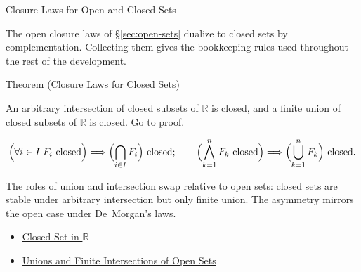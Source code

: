 \label{sec:unions-and-intersections}

\begin{topicbox}{Closure Laws for Open and Closed Sets}
\begin{exposition}
The open closure laws of \S\ref{sec:open-sets} dualize to closed sets by complementation. Collecting them gives the bookkeeping rules used throughout the rest of the development.
\end{exposition}
\end{topicbox}
\begin{theorembox}{Theorem (Closure Laws for Closed Sets)}
\begin{theorem}
\label{thm:closed-set-closure-operations}
An arbitrary intersection of closed subsets of $\mathbb{R}$ is closed, and a finite union of closed subsets of $\mathbb{R}$ is closed.
\hyperref[prf:closed-set-closure-operations]{Go to proof.}
\end{theorem}
\end{theorembox}
\begin{remark*}
\[
\Bigl(\forall i\in I\;F_i\text{ closed}\Bigr)\Longrightarrow \Bigl(\bigcap_{i\in I} F_{i}\Bigr) \text{ closed};\qquad
\Bigl(\bigwedge_{k=1}^{n} F_k\text{ closed}\Bigr)\Longrightarrow \Bigl(\bigcup_{k=1}^{n} F_{k}\Bigr) \text{ closed}.
\]
\end{remark*}
\begin{remark*}[Interpretation]
The roles of union and intersection swap relative to open sets: closed sets are stable under arbitrary intersection but only finite union. The asymmetry mirrors the open case under De~Morgan's laws.
\end{remark*}
\begin{dependencies}
\begin{itemize}
  \item \hyperref[def:closed-set]{Closed Set in $\mathbb{R}$}
  \item \hyperref[thm:open-set-closure-operations]{Unions and Finite Intersections of Open Sets}
\end{itemize}
\end{dependencies}
